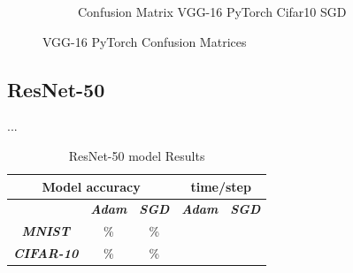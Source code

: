 \documentclass[conference]{IEEEtran}
\begin{document}
\begin{figure}[!htbp]
\begin{subfigure}[b]{0.22\textwidth}
        \caption{Confusion Matrix VGG-16 PyTorch Cifar10 SGD}
        \label{fig:x matrix_VGG-16_PyTorch_CIFAR_SGD}
    \end{subfigure}
    \caption{VGG-16 PyTorch Confusion Matrices}
    \label{fig:VGG-16 PyTorch Confusion Matrixis}
\end{figure}


\subsection{ResNet-50}
...
\begin{table}[!htbp]
    \caption{ResNet-50 model Results}
    \begin{center}
    \begin{tabular}{|c|c|c|c|c|}
    \cline{1-5} 
    \multicolumn{3}{|c|}{\textbf{Model accuracy}} & \multicolumn{2}{|c|}{\textbf{time/step}} \\
    \hline 
    \textit{} & \textbf{\textit{Adam}} & \textbf{\textit{SGD}} & \textbf{\textit{Adam}} & \textbf{\textit{SGD}} \\
    \hline
    \textbf{\textit{MNIST}} & \% & \% &  &  \\
    \hline
    \textbf{\textit{CIFAR-10}} & \% & \% &  &  \\
    \cline{1-5} 
    \end{tabular}
    \label{tab: ResNet-50 model accuracy}
    \end{center}
\end{table}
\end{document}
